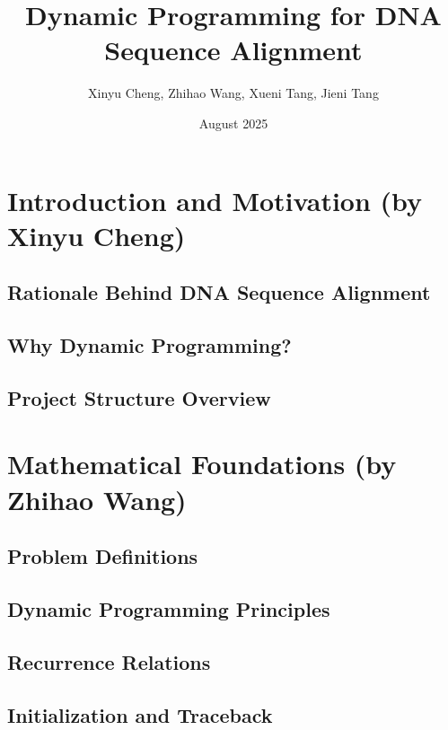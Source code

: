 \documentclass[12pt]{article}
\title{Dynamic Programming for DNA Sequence Alignment}
\author{Xinyu Cheng, Zhihao Wang, Xueni Tang, Jieni Tang}
\date{August 2025}
\begin{document}
\maketitle

\tableofcontents
\newpage

\section{Introduction and Motivation (by Xinyu Cheng)}
\subsection{Rationale Behind DNA Sequence Alignment}

\subsection{Why Dynamic Programming?}

\subsection{Project Structure Overview}

\section{Mathematical Foundations (by Zhihao Wang)}
\subsection{Problem Definitions}

\subsection{Dynamic Programming Principles}

\subsection{Recurrence Relations}

\subsection{Initialization and Traceback}
\end{document}
